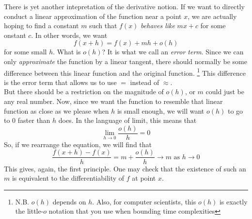 There is yet another intepretation of the derivative notion.
If we want to directly conduct a linear approximation of the function near a point $x$, we are actually hoping to find a constant $m$ such that $f(x)$ \textit{behaves like} $mx+c$ for some onstant $c$.
In other words, we want
$$f(x+h)=f(x)+mh+o(h)$$
for some small $h$.
What is $o(h)$? It is what we call an \textit{error term}.
Since we can only \textit{approximate} the function by a linear tangent, there should normally be some difference between this linear function and the original function.
\footnote{N.B. $o(h)$ depends on $h$. Also, for computer scientists, this $o(h)$ is exactly the little-$o$ notation that you use when bounding time complexities}
This difference is the error term that allows us to use $=$ instead of $\approx$.\\
But there should be a restriction on the magnitude of $o(h)$, or $m$ could just be any real number.
Now, since we want the function to resemble that linear function as close as we please when $h$ is small enough, we will want $o(h)$ to go to $0$ faster than $h$ does.
In the language of limit, this means that
$$\lim_{h\to0}\frac{o(h)}{h}=0$$
So, if we rearrange the equation, we will find that
$$\frac{f(x+h)-f(x)}{h}=m+\frac{o(h)}{h}\to m\text{ as }h\to0$$
This gives, again, the first principle. One may check that the existence of such an $m$ is equivalent to the differentiability of $f$ at point $x$.